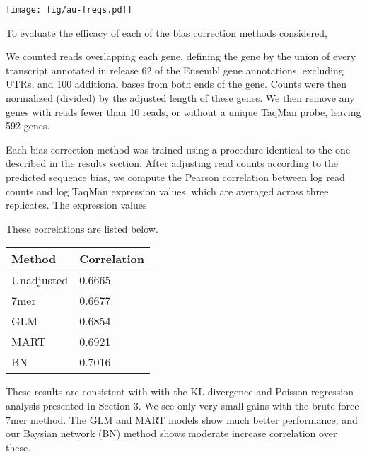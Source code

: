 \documentclass[letterpaper]{article}
\begin{document}
\centerline{\texttt{[image: fig/au-freqs.pdf]}}

To evaluate the efficacy of each of the bias correction methods considered, 

We counted reads overlapping each gene, defining the gene by the union of every
transcript annotated in release 62 of the Ensembl gene annotations, excluding
UTRs, and 100 additional bases from both ends of the gene. Counts were then
normalized (divided) by the adjusted length of these genes.  We then remove any
genes with reads fewer than 10 reads, or without a unique TaqMan probe, leaving
592 genes.

Each bias correction method was trained using a procedure identical to the one
described in the results section. After adjusting read counts according to the
predicted sequence bias, we compute the Pearson correlation between log read counts
and log TaqMan expression values, which are averaged across three replicates. The
expression values 

These correlations are listed below.

\begin{center}
\begin{tabular}{ll}
\textbf{Method} & \textbf{Correlation} \\ \hline
Unadjusted &  0.6665 \\
7mer &  0.6677 \\
GLM & 0.6854 \\
MART & 0.6921 \\
BN & 0.7016
\end{tabular}
\end{center}

These results are consistent with with the KL-divergence and Poisson regression
analysis presented in Section 3. We see only very small gains with the
brute-force 7mer method. The GLM and MART models show much better performance,
and our Baysian network (BN) method shows moderate increase correlation over these.




\end{document}
